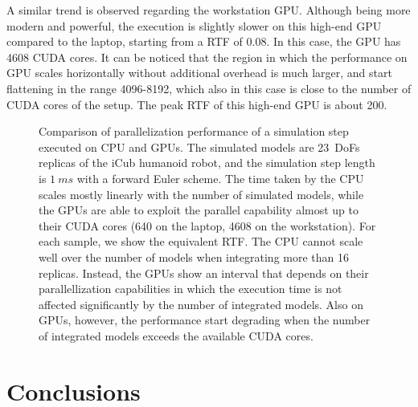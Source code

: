 A similar trend is observed regarding the workstation \ac{GPU}.
Although being more modern and powerful, the execution is slightly slower on this high-end \ac{GPU} compared to the laptop, starting from a \ac{RTF} of 0.08.
In this case, the \ac{GPU} has 4608 CUDA cores.
It can be noticed that the region in which the performance on \ac{GPU} scales horizontally without additional overhead is much larger, and start flattening in the range 4096-8192, which also in this case is close to the number of CUDA cores of the setup.
The peak \ac{RTF} of this high-end \ac{GPU} is about 200.

\begin{figure}
    \centering
    \caption{Comparison of parallelization performance of a simulation step executed on \acs{CPU} and \acp{GPU}. The simulated models are 23~\acp{DoF} replicas of the iCub humanoid robot, and the simulation step length is $1~ms$ with a forward Euler scheme. The time taken by the \acs{CPU} scales mostly linearly with the number of simulated models, while the \acp{GPU} are able to exploit the parallel capability almost up to their CUDA cores (640 on the laptop, 4608 on the workstation). For each sample, we show the equivalent \acs{RTF}. The \ac{CPU} cannot scale well over the number of models when integrating more than 16 replicas. Instead, the \acp{GPU} show an interval that depends on their parallellization capabilities in which the execution time is not affected significantly by the number of integrated models. Also on \acp{GPU}, however, the performance start degrading when the number of integrated models exceeds the available CUDA cores.}
    \label{fig:jaxsim_benchmark_parallel}
\end{figure}

\pagebreak
\section{Conclusions}

